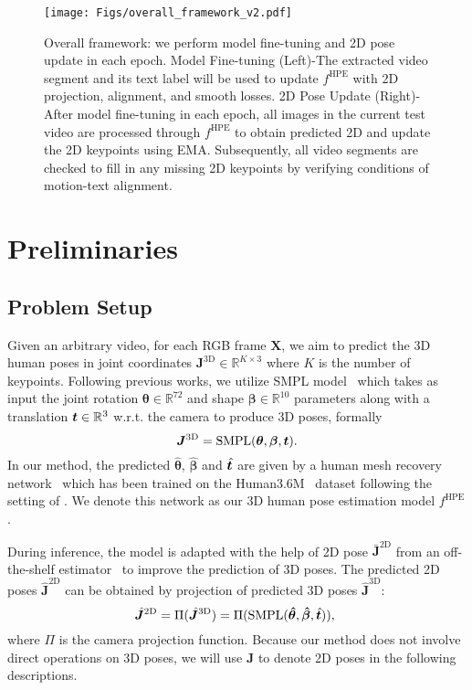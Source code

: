 \begin{figure*}[!h]
    \centering
    \texttt{[image: Figs/overall\_framework\_v2.pdf]}
    \caption{Overall framework: we perform model fine-tuning and 2D pose update in each epoch.
    Model Fine-tuning (Left)-The extracted video segment and its text label will be used to update $f^{\text{HPE}}$ with 2D projection, alignment, and smooth losses.
    2D Pose Update (Right)- 
    After model fine-tuning in each epoch, all images in the current test video are processed through $f^{\text{HPE}}$ to obtain predicted 2D and update the 2D keypoints using EMA. Subsequently, all video segments are checked to fill in any missing 2D keypoints by verifying conditions of motion-text alignment.}
    \label{fig:architecture} 
\end{figure*}

\section{Preliminaries} 
\subsection{Problem Setup}
Given an arbitrary video, for each RGB frame $\mathbf{X}$, we aim to predict the 3D human poses in joint coordinates $\bm{J}^{\text{3D}} \in \mathbb{R}^{K\times3}$ where $K$ is the number of keypoints. Following previous works, we utilize SMPL model~\cite{smpl} which takes as input the joint rotation $\boldsymbol{\theta} \in \mathbb{R}^{72}$ and shape $\boldsymbol{\beta} \in \mathbb{R}^{10}$ parameters along with a translation ${\bm{t}}\in\mathbb{R}^3$ w.r.t. the camera to produce 3D poses, formally
\begin{equation}
    \bm{J}^{\text{3D}} = \text{SMPL}(\boldsymbol{\theta}, \boldsymbol{\beta}, {\bm{t}}).
\end{equation}
In our method, the predicted $\boldsymbol{\hat{\theta}}$, $\boldsymbol{\hat{\beta}}$ and $\hat{{\bm{t}}}$ are given by  
a human mesh recovery network~\cite{hmrnet} which has been trained on the Human3.6M~\cite{human36m} dataset following the setting of \cite{dynaboa,iso,cycleadapt}.  
We denote this network as our 3D human pose estimation model $f^{\text{HPE}}$.

During inference, the model is adapted with the help of 2D pose $\bar{\bm{J}}^{\text{2D}}$ from an off-the-shelf estimator~\cite{openpose} to improve the prediction of 3D poses. 
{The predicted 2D poses $\hat{\bm{J}}^{\text{2D}}$ can be obtained by projection of predicted 3D poses $\hat{\bm{J}}^{\text{3D}}$:
\begin{equation}                
    \hat{\bm{J}}^{\text{2D}}=\Pi(\hat{\bm{J}}^{\text{3D}})=\Pi(\text{SMPL}(\boldsymbol{\hat{\theta}},\boldsymbol{\hat{\beta}},\hat{{\bm{t}}})),
    ~\label{Eq:motionclip_loss}
\end{equation}
where $\Pi$ is the camera projection function.}
Because our method does not involve direct operations on 3D poses, we will use $\bm{J}$ to denote 2D poses in the following descriptions.

